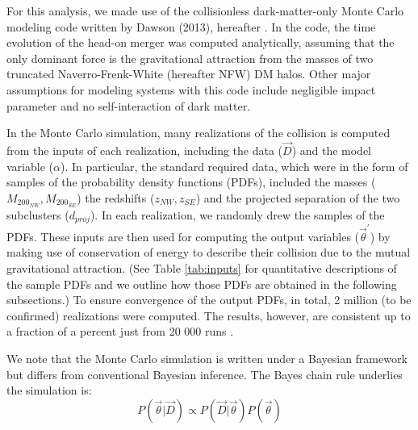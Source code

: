 For this analysis, we made use of the collisionless 
dark-matter-only Monte Carlo modeling code written by Dawson (2013),
hereafter .  
In the code, the time evolution of the head-on merger was computed
analytically, assuming that the only dominant force is the gravitational attraction from
the masses of two truncated Naverro-Frenk-White (hereafter NFW) DM halos.
Other major assumptions for modeling systems with this code include
negligible impact parameter and no self-interaction of dark matter.\par

In the Monte Carlo simulation, many realizations of the collision is
computed from the inputs of each realization, including
the data ($\vec{D}$) and the model variable ($\alpha$). In particular,
the standard required data, which were in the form of samples of the probability density
functions (PDFs), included the masses ($M_{200_{NW}},M_{200_{SE}}$) the
redshifts ($z_{NW}, z_{SE}$) and the projected separation of the two
subclusters ($d_{proj}$).  
In each realization, we randomly drew the samples of the PDFs.
%
These inputs are then used for computing the output variables
($\vec{\theta}^\prime$) by making use of conservation of energy to describe
their collision due to the mutual gravitational attraction.
(See Table \ref{tab:inputs}
for quantitative descriptions of the sample PDFs and we outline how those
PDFs are obtained in the following subsections.) 
To ensure convergence of the output PDFs, in total, 2 million (to be
confirmed) realizations were computed. The results, however, are
consistent up to a fraction of a percent just from 20 000 runs
.\par    
We note that the Monte Carlo simulation is written under a Bayesian
framework but differs from conventional Bayesian inference. The Bayes
chain rule underlies the simulation is:
\begin{equation}
    P(\vec{\theta}|\vec{D}) \propto P(\vec{D}|\vec{\theta})P(\vec{\theta})
\end{equation}
